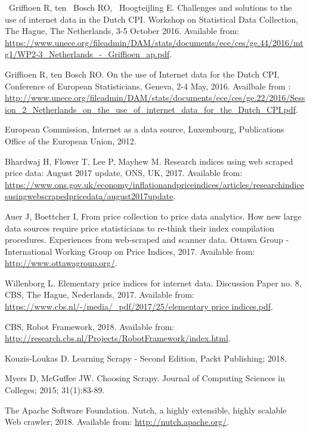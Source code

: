 \documentclass[]{article}
\begin{document}
\begin{thebibliography}{99}
~Griffioen R, ten ~Bosch RO, ~Hoogteijling E. Challenges and solutions to the use of internet data in the Dutch CPI. 
Workshop on Statistical Data Collection, The Hague, The Netherlands, 3-5 October 2016. Available from: \url{https://www.unece.org/fileadmin/DAM/stats/documents/ece/ces/ge.44/2016/mtg1/WP2-3\_Netherlands\_-\_Griffioen\_ap.pdf}.

Griffioen R, ten Bosch RO. On the use of Internet data for the Dutch CPI,
Conference of European Statisticians, Geneva, 2-4 May, 2016. Availbale from : \url{http://www.unece.org/fileadmin/DAM/stats/documents/ece/ces/ge.22/2016/Session\_2\_Netherlands\_on\_the\_use\_of\_internet\_data\_for\_the\_Dutch\_CPI.pdf}.


European Commission,
Internet as a data source,
Luxembourg, Publications Office of the European Union, 2012.

Bhardwaj H, Flower T, Lee P, Mayhew M. Research indices using web scraped price data: August 2017 update, ONS, UK, 2017. Available from:
\url{https://www.ons.gov.uk/economy/inflationandpriceindices/articles/researchindicesusingwebscrapedpricedata/august2017update}.

Auer J, Boettcher I, From price collection to price data analytics. How new large data sources require price statisticians to re-think their index compilation procedures. Experiences from web-scraped and scanner data.
Ottawa Group - International Working Group on Price Indices, 2017. Available from: \url{http://www.ottawagroup.org/}.

Willenborg L. Elementary price indices for internet data. Discussion Paper no. 8, CBS, The Hague, Nederlands, 2017. Available from:
\url{https://www.cbs.nl/-/media/\_pdf/2017/25/elementary price indices.pdf}.

CBS, Robot Framework, 2018. Available from: \url{http://research.cbs.nl/Projects/RobotFramework/index.html}.

Kouzis-Loukas D. Learning Scrapy - Second Edition, Packt Publishing; 2018.

Myers D, McGuffee JW. Choosing Scrapy. Journal of Computing Sciences in Colleges; 2015; 31(1):83-89.

The Apache Software Foundation. Nutch, a highly extensible, highly scalable Web crawler; 2018. Available from:
\url{http://nutch.apache.org/}.


\end{thebibliography}
\end{document}

